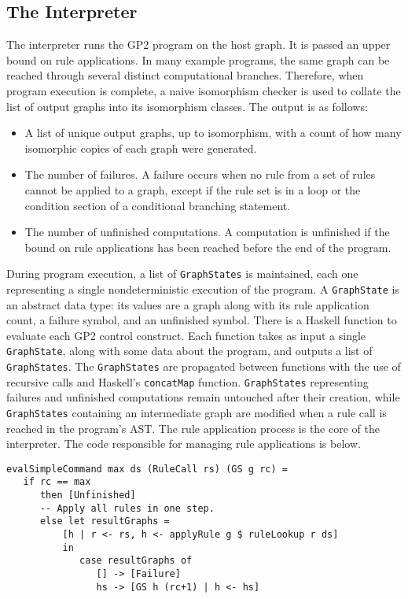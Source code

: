 \subsection{The Interpreter}

The interpreter runs the GP2 program on the host graph. It is passed an upper bound on rule applications. In many example programs, the same graph can be reached through several distinct computational branches. Therefore, when program execution is complete, a naive isomorphism checker is used to collate the list of output graphs into its isomorphism classes. The output is as follows:

\begin{itemize}
\item A list of unique output graphs, up to isomorphism, with a count of how many isomorphic copies of each graph were generated.
\item The number of failures. A failure occurs when no rule from a set of rules cannot be applied to a graph, except if the rule set is in a loop or the condition section of a conditional branching statement.
\item The number of unfinished computations. A computation is unfinished if the bound on rule applications has been reached before the end of the program.
\end{itemize}

During program execution, a list of \texttt{GraphStates} is maintained, each one representing a single nondeterministic execution of the program. A \texttt{GraphState} is an abstract data type: its values are a graph along with its rule application count, a failure symbol, and an unfinished symbol. There is a Haskell function to evaluate each GP2 control construct. Each function takes as input a single \texttt{GraphState}, along with some data about the program, and outputs a list of \texttt{GraphStates}. The \texttt{GraphStates} are propagated between functions with the use of recursive calls and Haskell's \texttt{concatMap} function. \texttt{GraphStates} representing failures and unfinished computations remain untouched after their creation, while \texttt{GraphStates} containing an intermediate graph are modified when a rule call is reached in the program's AST. The rule application process is the core of the interpreter. The code responsible for managing rule applications is below.

\begin{verbatim}
evalSimpleCommand max ds (RuleCall rs) (GS g rc) = 
   if rc == max 
      then [Unfinished]
      -- Apply all rules in one step.
      else let resultGraphs = 
          [h | r <- rs, h <- applyRule g $ ruleLookup r ds] 
          in
             case resultGraphs of
                [] -> [Failure]
                hs -> [GS h (rc+1) | h <- hs]
\end{verbatim}

